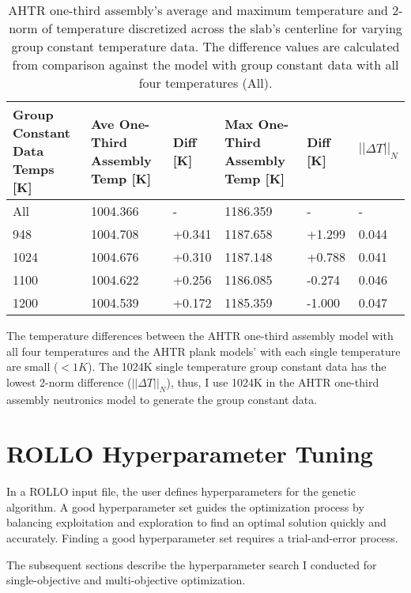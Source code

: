 \begin{table}[htbp]
    \centering
    \onehalfspacing
    \caption{AHTR one-third assembly's average and maximum temperature and 2-norm of 
    temperature discretized across the slab's centerline for varying group constant 
    temperature data. The difference values are calculated from 
    comparison against the model with group constant data with all four temperatures 
    (All).}
	\label{tab:moltres-group-constant-temps-assem}
    \scriptsize
    \begin{tabular}{p{2.5cm}p{2.5cm}p{2cm}p{2.5cm}p{2cm}p{2cm}}
    \hline 
    \textbf{Group Constant Data Temps [K]}& \textbf{Ave One-Third Assembly Temp [K]}& 
    \textbf{Diff [K]}& \textbf{Max One-Third Assembly Temp [K]} & 
    \textbf{Diff [K]} & $||\Delta T||_N$ \\ 
    \hline 
    All  & 1004.366 &  -     & 1186.359 & -      & -    \\
    948 & 1004.708 & +0.341 & 1187.658 & +1.299 & 0.044 \\
    1024 & 1004.676 & +0.310 & 1187.148 & +0.788 & 0.041 \\
    1100 & 1004.622 & +0.256 & 1186.085 & -0.274 & 0.046\\
    1200 & 1004.539 & +0.172 & 1185.359 & -1.000 & 0.047 \\
    \hline
    \end{tabular}
\end{table}
The temperature differences between the AHTR one-third assembly model with all four 
temperatures and the AHTR plank models' with each single temperature are small ($<1K$). 
The 1024K single temperature group constant data has the lowest 2-norm difference 
($||\Delta T||_N$), thus, I use 1024K in the \gls{AHTR} one-third assembly 
neutronics model to generate the group constant data.

\section{ROLLO Hyperparameter Tuning}
\label{sec:hyperparameter-studies}
In a \gls{ROLLO} input file, the user defines hyperparameters for the genetic 
algorithm.
A good hyperparameter set guides the optimization process by 
balancing exploitation and exploration to find an optimal solution quickly 
and accurately. 
Finding a good hyperparameter set requires a trial-and-error process. 

The subsequent sections describe the hyperparameter search I conducted for single-objective 
and multi-objective optimization. 

